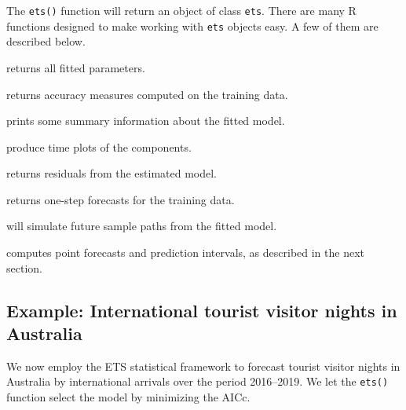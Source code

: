 \documentclass[]{book}
\providecommand{\tightlist}{%
  \setlength{\itemsep}{0pt}\setlength{\parskip}{0pt}}
\begin{document}
The \texttt{ets()} function will return an object of class \texttt{ets}. There are many R functions designed to make working with \texttt{ets} objects easy. A few of them are described below.

\begin{description}
\tightlist
\item[\texttt{coef()}]
returns all fitted parameters.
\item[\texttt{accuracy()}]
returns accuracy measures computed on the training data.
\item[\texttt{summary()}]
prints some summary information about the fitted model.
\item[\texttt{autoplot()} and \texttt{plot()}]
produce time plots of the components.
\item[\texttt{residuals()}]
returns residuals from the estimated model.
\item[\texttt{fitted()}]
returns one-step forecasts for the training data.
\item[\texttt{simulate()}]
will simulate future sample paths from the fitted model.
\item[\texttt{forecast()}]
computes point forecasts and prediction intervals, as described in the next section.
\end{description}

\hypertarget{example-international-tourist-visitor-nights-in-australia-1}{%
\subsection*{Example: International tourist visitor nights in Australia}\label{example-international-tourist-visitor-nights-in-australia-1}}

We now employ the ETS statistical framework to forecast tourist visitor nights in Australia by international arrivals over the period 2016--2019. We let the \texttt{ets()} function select the model by minimizing the AICc.
\end{document}
